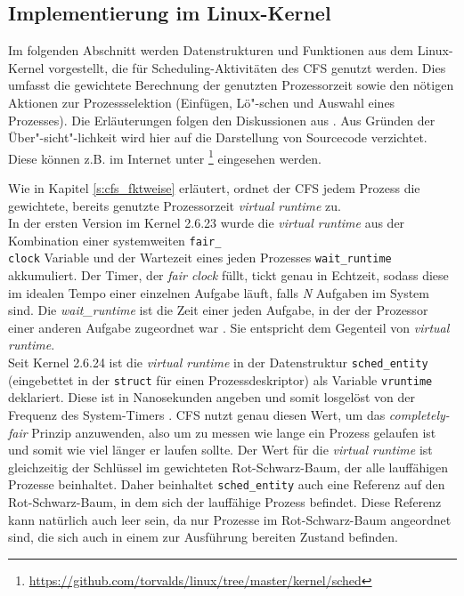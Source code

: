 \subsection{Implementierung im Linux-Kernel}\label{s:cstructs}
Im folgenden Abschnitt werden Datenstrukturen und Funktionen aus dem Linux-Kernel vorgestellt, die für Scheduling-Aktivitäten des CFS genutzt werden. Dies umfasst die gewichtete Berechnung der genutzten Prozessorzeit sowie den nötigen Aktionen zur Prozessselektion (Einfügen, Lö"-schen und Auswahl eines Prozesses). Die Erläuterungen folgen den Diskussionen aus \cite{rlove}. Aus Gründen der Über"-sicht"-lichkeit wird hier auf die Darstellung von Sourcecode verzichtet. Diese können z.B. im Internet unter \footnote{\url{https://github.com/torvalds/linux/tree/master/kernel/sched}} eingesehen werden.

Wie in Kapitel \ref{s:cfs_fktweise} erläutert, ordnet der CFS jedem Prozess die gewichtete, bereits genutzte Prozessorzeit \textit{virtual runtime} zu. \\
In der ersten Version im Kernel 2.6.23 wurde die \textit{virtual runtime} aus der Kombination einer systemweiten \texttt{fair\_\\clock} Variable und der Wartezeit eines jeden Prozesses \texttt{wait\_runtime} akkumuliert. Der Timer, der \textit{fair clock} füllt, tickt genau in Echtzeit, sodass diese im idealen Tempo einer einzelnen Aufgabe läuft, falls \textit{N} Aufgaben im System sind. Die \textit{wait\_runtime} ist die Zeit einer jeden Aufgabe, in der der Prozessor einer anderen Aufgabe zugeordnet war \cite{cpabla}. Sie entspricht dem Gegenteil von \textit{virtual runtime}.\\
Seit Kernel 2.6.24 ist die \textit{virtual runtime} in der Datenstruktur \texttt{sched\_entity} (eingebettet in der \texttt{struct} für einen Prozessdeskriptor) als Variable \texttt{vrun\-time} deklariert. Diese ist in Nanosekunden angeben und somit losgelöst von der Frequenz des System-Timers \cite{rlove}. CFS nutzt genau diesen Wert, um das \textit{completely-fair} Prinzip anzuwenden, also um zu messen wie lange ein Prozess gelaufen ist und somit wie viel länger er laufen sollte.
Der Wert für die \textit{virtual runtime} ist gleichzeitig der Schlüssel im gewichteten Rot-Schwarz-Baum, der alle lauffähigen Prozesse beinhaltet. Daher beinhaltet \texttt{sched\_entity} auch eine Referenz auf den Rot-Schwarz-Baum, in dem sich der lauffähige Prozess befindet. Diese Referenz kann natürlich auch leer sein, da nur Prozesse im Rot-Schwarz-Baum angeordnet sind, die sich auch in einem zur Ausführung bereiten Zustand befinden.

